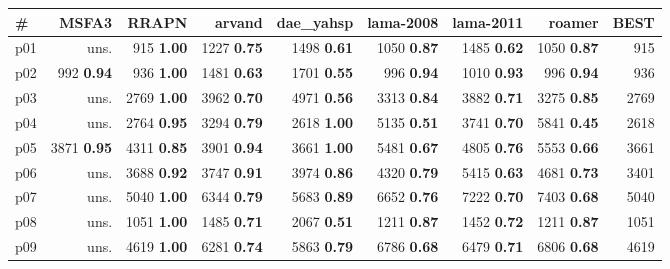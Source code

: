 \begin{tabular}{|l|rrrrrrr|r|}
\hline
\textbf{\#} & \textbf{MSFA3} & \textbf{RRAPN} & \textbf{arvand} & \textbf{dae\_yahsp} & \textbf{lama-2008} & \textbf{lama-2011} & \textbf{roamer} & \textbf{BEST}\\
\hline
p01 & uns. & {\footnotesize 915} \textbf{1.00} & {\footnotesize 1227} \textbf{0.75} & {\footnotesize 1498} \textbf{0.61} & {\footnotesize 1050} \textbf{0.87} & {\footnotesize 1485} \textbf{0.62} & {\footnotesize 1050} \textbf{0.87} & 915\\
p02 & {\footnotesize 992} \textbf{0.94} & {\footnotesize 936} \textbf{1.00} & {\footnotesize 1481} \textbf{0.63} & {\footnotesize 1701} \textbf{0.55} & {\footnotesize 996} \textbf{0.94} & {\footnotesize 1010} \textbf{0.93} & {\footnotesize 996} \textbf{0.94} & 936\\
p03 & uns. & {\footnotesize 2769} \textbf{1.00} & {\footnotesize 3962} \textbf{0.70} & {\footnotesize 4971} \textbf{0.56} & {\footnotesize 3313} \textbf{0.84} & {\footnotesize 3882} \textbf{0.71} & {\footnotesize 3275} \textbf{0.85} & 2769\\
p04 & uns. & {\footnotesize 2764} \textbf{0.95} & {\footnotesize 3294} \textbf{0.79} & {\footnotesize 2618} \textbf{1.00} & {\footnotesize 5135} \textbf{0.51} & {\footnotesize 3741} \textbf{0.70} & {\footnotesize 5841} \textbf{0.45} & 2618\\
p05 & {\footnotesize 3871} \textbf{0.95} & {\footnotesize 4311} \textbf{0.85} & {\footnotesize 3901} \textbf{0.94} & {\footnotesize 3661} \textbf{1.00} & {\footnotesize 5481} \textbf{0.67} & {\footnotesize 4805} \textbf{0.76} & {\footnotesize 5553} \textbf{0.66} & 3661\\
p06 & uns. & {\footnotesize 3688} \textbf{0.92} & {\footnotesize 3747} \textbf{0.91} & {\footnotesize 3974} \textbf{0.86} & {\footnotesize 4320} \textbf{0.79} & {\footnotesize 5415} \textbf{0.63} & {\footnotesize 4681} \textbf{0.73} & 3401\\
p07 & uns. & {\footnotesize 5040} \textbf{1.00} & {\footnotesize 6344} \textbf{0.79} & {\footnotesize 5683} \textbf{0.89} & {\footnotesize 6652} \textbf{0.76} & {\footnotesize 7222} \textbf{0.70} & {\footnotesize 7403} \textbf{0.68} & 5040\\
p08 & uns. & {\footnotesize 1051} \textbf{1.00} & {\footnotesize 1485} \textbf{0.71} & {\footnotesize 2067} \textbf{0.51} & {\footnotesize 1211} \textbf{0.87} & {\footnotesize 1452} \textbf{0.72} & {\footnotesize 1211} \textbf{0.87} & 1051\\
p09 & uns. & {\footnotesize 4619} \textbf{1.00} & {\footnotesize 6281} \textbf{0.74} & {\footnotesize 5863} \textbf{0.79} & {\footnotesize 6786} \textbf{0.68} & {\footnotesize 6479} \textbf{0.71} & {\footnotesize 6806} \textbf{0.68} & 4619\\

\end{tabular}
